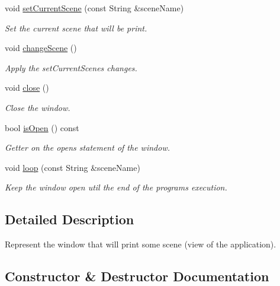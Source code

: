 \begin{DoxyCompactItemize}
void \hyperlink{classWindow_a3342dc02339a5974d5c6fcefd91d0cbf}{set\+Current\+Scene} (const String \&scene\+Name)
\begin{DoxyCompactList}\small\item\em Set the current scene that will be print. \end{DoxyCompactList}\item 
void \hyperlink{classWindow_af1b2a635ce47d9e841445b8b866a3b28}{change\+Scene} ()
\begin{DoxyCompactList}\small\item\em Apply the set\+Current\+Scene\textquotesingle{}s changes. \end{DoxyCompactList}\item 
void \hyperlink{classWindow_a35055c04498121d39741bfcd5082705b}{close} ()
\begin{DoxyCompactList}\small\item\em Close the window. \end{DoxyCompactList}\item 
bool \hyperlink{classWindow_a761d614931fb5a5daa70e4f580c3e78e}{is\+Open} () const
\begin{DoxyCompactList}\small\item\em Getter on the open\textquotesingle{}s statement of the window. \end{DoxyCompactList}\item 
void \hyperlink{classWindow_a9c9f1fd6ebc2b93f16ca870487a4a4c6}{loop} (const String \&scene\+Name)
\begin{DoxyCompactList}\small\item\em Keep the window open util the end of the program\textquotesingle{}s execution. \end{DoxyCompactList}\end{DoxyCompactItemize}


\subsection{Detailed Description}
Represent the window that will print some scene (view of the application). 

\subsection{Constructor \& Destructor Documentation}
\mbox{\label{classWindow_a25fd6af55e81b781b132166f77daf77e}} 
